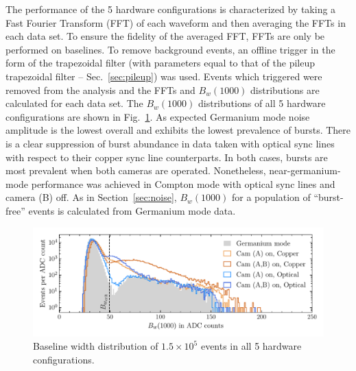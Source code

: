 The performance of the 5 hardware configurations is characterized by taking a Fast Fourier Transform (FFT) of each waveform and then averaging the FFTs in each data set. To ensure the fidelity of the averaged FFT, FFTs are only be performed on baselines. To remove background events, an offline trigger in the form of the trapezoidal filter (with parameters equal to that of the pileup trapezoidal filter -- Sec.~\ref{sec:pileup}) was used. Events which triggered were removed from the analysis and the FFTs and $B_w(1000)$ distributions are calculated for each data set. The $B_w(1000)$ distributions of all 5 hardware configurations are shown in Fig.~\ref{fig:baseline_width_optical}. As expected Germanium mode noise amplitude is the lowest overall and exhibits the lowest prevalence of bursts. There is a clear suppression of burst abundance in data taken with optical sync lines with respect to their copper sync line counterparts. In both cases, bursts are most prevalent when both cameras are operated. Nonetheless, near-germanium-mode performance was achieved in Compton mode with optical sync lines and camera (B) off. As in Section~\ref{sec:noise}, $B_w(1000)$ for a population of ``burst-free'' events is calculated from Germanium mode data.
\begin{figure}[htb]
    \centering
	\vspace*{-10pt}
    \includegraphics[width=6in]{figs/param/baseline_width_all_modes_6_9in.pdf}
	\vspace*{-10mm}
    \caption{Baseline width distribution of $1.5\times10^5$ events in all 5 hardware configurations.}
    \label{fig:baseline_width_optical}
	\vspace*{-5pt}
\end{figure}

